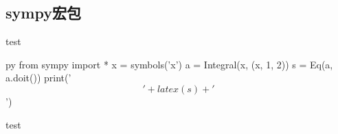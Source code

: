 \documentclass[11pt,oneside]{book}
\begin{document}
\begin{common-format}
\chapter{sympy宏包}
test
\begin{xverbatim}[139]{py}
from sympy import *
x = symbols('x')
a = Integral(x, (x, 1, 2))
s = Eq(a, a.doit())
print('$$'+ latex(s) + '$$')
\end{xverbatim}
test































































\end{common-format}
\end{document}
